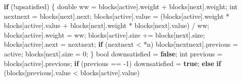\documentclass[
  12pt,
  letterpaper,
  DIV=11,
  numbers=noendperiod]{scrreprt}
\newenvironment{Shaded}{\begin{snugshade}}{\end{snugshade}}
\newcommand{\ControlFlowTok}[1]{\textcolor[rgb]{0.00,0.23,0.31}{\textbf{#1}}}
\newcommand{\DataTypeTok}[1]{\textcolor[rgb]{0.68,0.00,0.00}{#1}}
\newcommand{\DecValTok}[1]{\textcolor[rgb]{0.68,0.00,0.00}{#1}}
\newcommand{\KeywordTok}[1]{\textcolor[rgb]{0.00,0.23,0.31}{\textbf{#1}}}
\newcommand{\NormalTok}[1]{\textcolor[rgb]{0.00,0.23,0.31}{#1}}
\newcommand{\OperatorTok}[1]{\textcolor[rgb]{0.37,0.37,0.37}{#1}}
\theoremstyle{remark}
\begin{document}
\begin{Shaded}
\begin{Highlighting}[]
        \ControlFlowTok{if} \OperatorTok{(!}\NormalTok{upsatisfied}\OperatorTok{)} \OperatorTok{\{}
            \DataTypeTok{double}\NormalTok{ ww }\OperatorTok{=}\NormalTok{ blocks}\OperatorTok{[}\NormalTok{active}\OperatorTok{].}\NormalTok{weight }\OperatorTok{+}\NormalTok{ blocks}\OperatorTok{[}\NormalTok{next}\OperatorTok{].}\NormalTok{weight}\OperatorTok{;}
            \DataTypeTok{int}\NormalTok{ nextnext }\OperatorTok{=}\NormalTok{ blocks}\OperatorTok{[}\NormalTok{next}\OperatorTok{].}\NormalTok{next}\OperatorTok{;}
\NormalTok{            blocks}\OperatorTok{[}\NormalTok{active}\OperatorTok{].}\NormalTok{value }\OperatorTok{=}
                \OperatorTok{(}\NormalTok{blocks}\OperatorTok{[}\NormalTok{active}\OperatorTok{].}\NormalTok{weight }\OperatorTok{*}\NormalTok{ blocks}\OperatorTok{[}\NormalTok{active}\OperatorTok{].}\NormalTok{value }\OperatorTok{+}
\NormalTok{                 blocks}\OperatorTok{[}\NormalTok{next}\OperatorTok{].}\NormalTok{weight }\OperatorTok{*}\NormalTok{ blocks}\OperatorTok{[}\NormalTok{next}\OperatorTok{].}\NormalTok{value}\OperatorTok{)} \OperatorTok{/}
\NormalTok{                ww}\OperatorTok{;}
\NormalTok{            blocks}\OperatorTok{[}\NormalTok{active}\OperatorTok{].}\NormalTok{weight }\OperatorTok{=}\NormalTok{ ww}\OperatorTok{;}
\NormalTok{            blocks}\OperatorTok{[}\NormalTok{active}\OperatorTok{].}\NormalTok{size }\OperatorTok{+=}\NormalTok{ blocks}\OperatorTok{[}\NormalTok{next}\OperatorTok{].}\NormalTok{size}\OperatorTok{;}
\NormalTok{            blocks}\OperatorTok{[}\NormalTok{active}\OperatorTok{].}\NormalTok{next }\OperatorTok{=}\NormalTok{ nextnext}\OperatorTok{;}
            \ControlFlowTok{if} \OperatorTok{(}\NormalTok{nextnext }\OperatorTok{\textless{}} \OperatorTok{*}\NormalTok{n}\OperatorTok{)}\NormalTok{ blocks}\OperatorTok{[}\NormalTok{nextnext}\OperatorTok{].}\NormalTok{previous }\OperatorTok{=}\NormalTok{ active}\OperatorTok{;}
\NormalTok{            blocks}\OperatorTok{[}\NormalTok{next}\OperatorTok{].}\NormalTok{size }\OperatorTok{=} \DecValTok{0}\OperatorTok{;}
        \OperatorTok{\}}
        \DataTypeTok{bool}\NormalTok{ downsatisfied }\OperatorTok{=} \KeywordTok{false}\OperatorTok{;}
        \DataTypeTok{int}\NormalTok{ previous }\OperatorTok{=}\NormalTok{ blocks}\OperatorTok{[}\NormalTok{active}\OperatorTok{].}\NormalTok{previous}\OperatorTok{;}
        \ControlFlowTok{if} \OperatorTok{(}\NormalTok{previous }\OperatorTok{==} \OperatorTok{{-}}\DecValTok{1}\OperatorTok{)}
\NormalTok{            downsatisfied }\OperatorTok{=} \KeywordTok{true}\OperatorTok{;}
        \ControlFlowTok{else} \ControlFlowTok{if} \OperatorTok{(}\NormalTok{blocks}\OperatorTok{[}\NormalTok{previous}\OperatorTok{].}\NormalTok{value }\OperatorTok{\textless{}}\NormalTok{ blocks}\OperatorTok{[}\NormalTok{active}\OperatorTok{].}\NormalTok{value}\OperatorTok{)}

\end{Highlighting}
\end{Shaded}
\end{document}
